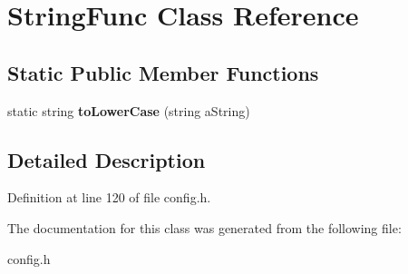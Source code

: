 \hypertarget{class_string_func}{}\section{String\+Func Class Reference}
\label{class_string_func}
\subsection*{Static Public Member Functions}
\begin{DoxyCompactItemize}
\item 
\hypertarget{class_string_func_ae4f83e5ac07871e85547dc287bde3ff5}{}\label{class_string_func_ae4f83e5ac07871e85547dc287bde3ff5} 
static string {\bfseries to\+Lower\+Case} (string a\+String)
\end{DoxyCompactItemize}


\subsection{Detailed Description}


Definition at line 120 of file config.\+h.



The documentation for this class was generated from the following file\+:\begin{DoxyCompactItemize}
\item 
config.\+h\end{DoxyCompactItemize}
